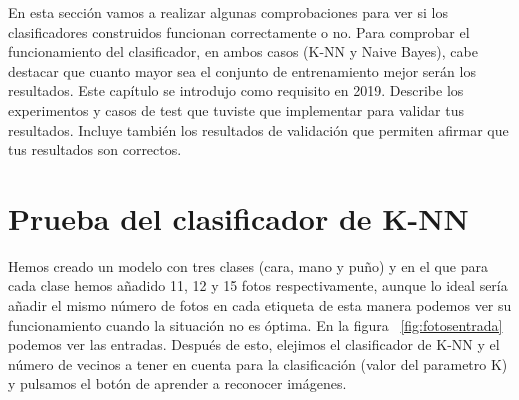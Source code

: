 \documentclass[a4paper, 12pt]{book}
\begin{document}
En esta sección vamos a realizar algunas comprobaciones para ver si los clasificadores construidos funcionan correctamente o no. Para comprobar el funcionamiento del clasificador, en ambos casos (K-NN y Naive Bayes), cabe destacar que cuanto mayor sea el conjunto de entrenamiento mejor serán los resultados.
Este capítulo se introdujo como requisito en 2019. 
Describe los experimentos y casos de test que tuviste que implementar para validar tus resultados. 
Incluye también los resultados de validación que permiten afirmar que tus resultados son correctos. 

\section{Prueba del clasificador de K-NN} 
\label{sec:pruebaknn}

Hemos creado un modelo con tres clases (cara, mano y puño) y en el que para cada clase hemos añadido 11, 12 y 15 fotos respectivamente, aunque lo ideal sería añadir el mismo número de fotos en cada etiqueta de esta manera podemos ver su funcionamiento cuando la situación no es óptima. En la figura ~\ref{fig:fotosentrada} podemos ver las entradas. Después de esto, elejimos el clasificador de K-NN y el número de vecinos a tener en cuenta para la clasificación (valor del parametro K) y pulsamos el botón de aprender a reconocer imágenes.
\end{document}
